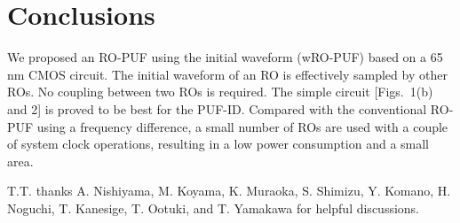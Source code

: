 \documentclass[%
reprint, amsmath,amssymb,%
pra,
]{revtex4-1}
\begin{document}
\section{Conclusions}
   We proposed an RO-PUF using the initial waveform (wRO-PUF) based on a 65 nm CMOS circuit. 
The initial waveform of an RO is effectively sampled by other ROs. 
No coupling between two ROs is required. The simple circuit [Figs.~1(b) and 2] is proved to be best for the PUF-ID. 
Compared with the conventional RO-PUF using a frequency difference, a small number of ROs 
are used with a couple of system clock operations, resulting in a low power consumption and a small area.


\acknowledgments
T.T. thanks A. Nishiyama, M. Koyama, K. Muraoka, S. Shimizu, 
Y. Komano, H. Noguchi, T. Kanesige, T. Ootuki,
and T. Yamakawa for helpful discussions.
\end{document}
